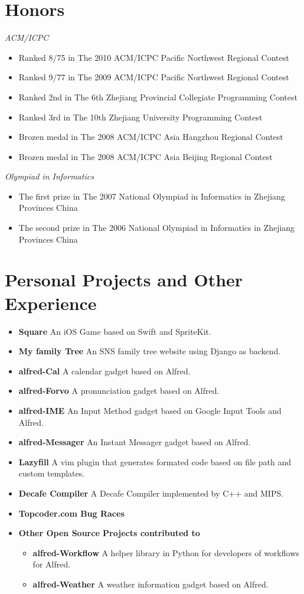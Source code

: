 \documentclass[line,margin]{res}
\begin{document}
\begin{resume}
\section{Honors}
{\sl ACM/ICPC}
\begin{itemize}
\item Ranked 8/75 in The 2010 ACM/ICPC Pacific Northwest Regional Contest	
\item Ranked 9/77 in The 2009 ACM/ICPC Pacific Northwest Regional Contest	
\item Ranked 2nd in The 6th Zhejiang Provincial Collegiate Programming Contest 
\item Ranked 3rd in The 10th Zhejiang University Programming Contest 
\item Brozen medal in The 2008 ACM/ICPC Asia Hangzhou Regional Contest 
\item Brozen medal in The 2008 ACM/ICPC Asia Beijing Regional Contest   

\end{itemize}
{\sl Olympiad in Informatics}
\begin{itemize}
\item The first  prize in The 2007 National Olympiad in Informatics in Zhejiang Provinces China 
\item The second prize in The 2006 National Olympiad in Informatics in Zhejiang Provinces China
\end{itemize}


\section{Personal Projects and Other Experience}
\begin{itemize}
\item {\bf Square} An iOS Game based on Swift and SpriteKit.
\item {\bf My family Tree} An SNS family tree website using Django as backend.
\item {\bf alfred-Cal} A calendar gadget based on Alfred.
\item {\bf alfred-Forvo} A pronunciation gadget based on Alfred. 
\item {\bf alfred-IME} An Input Method gadget based on Google Input Tools and Alfred.
\item {\bf alfred-Messager} An Instant Messager gadget based on Alfred.
\item {\bf Lazyfill} A vim plugin that generates formated code based on file path and custom templates.

\item {\bf Decafe Compiler} A Decafe Compiler implemented by C++ and MIPS.
\item {\bf Topcoder.com Bug Races}
\item {\bf Other Open Source Projects contributed to}
	\begin{itemize}
		\item {\bf alfred-Workflow} A helper library in Python for developers of workflows for Alfred.
		\item {\bf alfred-Weather} A weather information gadget based on Alfred.
	\end{itemize}
\end{itemize}

\end{resume}
\end{document}

